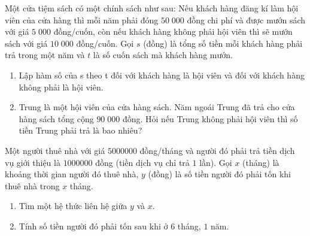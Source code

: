 \begin{bt}%
	Một cửa tiệm sách có một chính sách như sau: Nếu khách hàng đăng kí làm hội viên của cửa hàng thì mỗi năm phải đóng $50\;000$ đồng chi phí và được mướn sách với giá $5\;000$ đồng/cuốn, còn nếu khách hàng không phải hội viên thì sẽ mướn sách với giá $10\;000$ đồng/cuốn.
	Gọi $s$ (đồng) là tổng số tiền mỗi khách hàng phải trả trong một năm và $t$ là số cuốn sách mà khách hàng mướn.
	\begin{enumerate}
		\item Lập hàm số của s theo t đối với khách hàng là hội viên và đối với khách hàng không phải là hội viên.
		\item Trung là một hội viên của cửa hàng sách. Năm ngoái Trung đã trả cho cửa hàng sách tổng cộng $90\;000$ đồng. Hỏi nếu Trung không phải hội viên thì số tiền Trung phải trả là bao nhiêu?
	\end{enumerate}
	
\end{bt}

\begin{bt}%
	Một người thuê nhà với giá $5000000$ đồng/tháng và người đó phải trả tiền dịch vụ giới thiệu là $1000000$ đồng (tiền dịch vụ chỉ trả $1$ lần). Gọi $x$ (tháng) là khoảng thời gian người đó thuê nhà, $y$ (đồng) là số tiền người đó phải tốn khi thuê nhà trong $x$ tháng.
	\begin{enumerate}
		\item Tìm một hệ thức liên hệ giữa $y$ và $x$.
		\item Tính số tiền người đó phải tốn sau khi ở $6$ tháng, $1$ năm. 
	\end{enumerate}
\end{bt}

